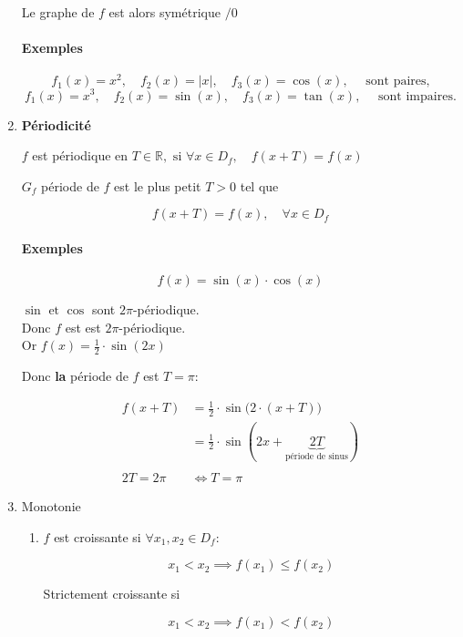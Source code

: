 \documentclass[
    11pt,
    a4paper,
    oneside,
    headinlcude, footinclude,
    twoside,
]{report}
\begin{document}
\begin{enumerate}
Le graphe de $f$ est alors symétrique $/0$

\paragraph{Exemples}
\label{par:exemples}

$$f_{1}(x) = x^{2}, \quad f_{2}(x) = |x|, \quad f_{3}(x) = \cos(x), \quad \text{ sont paires,}$$
$$f_{1}(x) = x^{3}, \quad f_{2}(x) = \sin(x), \quad f_{3}(x) = \tan(x), \quad \text{ sont impaires.}$$

\item \textbf{Périodicité}

$f$ est périodique en $T \in \mathbb{R}, \text{ si } \forall x \in D_{f},
\quad f(x+T) = f(x)$

$G_{f}$ période de $f$ est le plus petit $T > 0$ tel que 

$$f(x+T) = f(x), \quad \forall x \in D_{f}$$

\paragraph{Exemples}
\label{par:exemples}
        
$$f(x) = \sin(x)\cdot\cos(x)$$
        
$\sin \text{ et } \cos$ sont $2\pi$-périodique.\\
Donc $f$ est est $2\pi$-périodique.\\
Or $f(x) = \frac{1}{2} \cdot \sin(2x)$

Donc \textbf{la} période de $f$ est $T = \pi$:

\[
\begin{split}
f(x + T) &= \frac{1}{2} \cdot \sin\big(2\cdot(x+T)\big)\\
&= \frac{1}{2} \cdot \sin(2x + \underbrace{2T}_{\text{période de
sinus}})\\
\\
2T = 2 \pi &\iff T = \pi
\end{split}
\]

\item Monotonie
\begin{enumerate}
\item $f$ est croissante si $\forall x_{1}, x_{2} \in D_{f}$:

$$x_{1} < x_{2} \implies f(x_{1}) \leq f(x_{2})$$

Strictement croissante si 

$$x_{1} < x_{2} \implies f(x_{1}) < f(x_{2})$$


\end{enumerate}
\end{enumerate}
\end{document}
